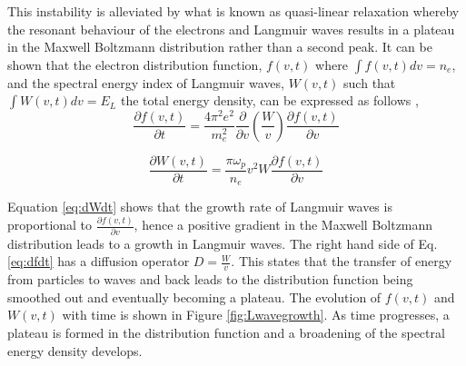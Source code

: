 This instability is alleviated by what is known as quasi-linear relaxation \citep{Melrose1987} whereby the resonant behaviour of the electrons and Langmuir waves results in a plateau in the Maxwell Boltzmann distribution rather than a second peak. It can be shown that \citep{Vedenov1963} the electron distribution function, $f(v,t)$ where $\int f(v,t) dv = n_e$, and the spectral energy index of Langmuir waves, $W(v,t)$ such that $\int W(v,t) dv = E_L$ the total energy density, can be expressed as follows \citep{Reid2014},
\begin{equation}\label{eq:dfdt}
    \frac{\partial f(v,t)}{\partial t}=\frac{4 \pi^2 e^2}{m_e^2} \frac{\partial}{\partial v} \left( \frac{W}{v} \right) \frac{\partial f(v,t)}{\partial v}
\end{equation}

\begin{equation}\label{eq:dWdt}
    \frac{\partial W(v,t)}{\partial t}= \frac{\pi \omega_p}{n_e} v^2 W \frac{\partial f(v,t)}{\partial v}
\end{equation}

Equation \ref{eq:dWdt} shows that the growth rate of Langmuir waves is proportional to $\frac{\partial f(v,t)}{\partial v}$, hence a positive gradient in the Maxwell Boltzmann distribution leads to a growth in Langmuir waves. The right hand side of Eq. \ref{eq:dfdt} has a diffusion operator $D=\frac{W}{v}$. This states that the transfer of energy from particles to waves and back leads to the distribution function being smoothed out and eventually becoming a plateau. The evolution of $f(v,t)$ and $W(v,t)$ with time is shown in Figure \ref{fig:Lwavegrowth}.  As time progresses, a plateau is formed in the distribution function and a broadening of the spectral energy density develops.	

